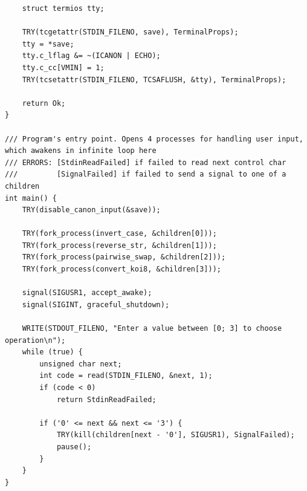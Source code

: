\begin{verbatim}
    struct termios tty;

    TRY(tcgetattr(STDIN_FILENO, save), TerminalProps);
    tty = *save;
    tty.c_lflag &= ~(ICANON | ECHO);
    tty.c_cc[VMIN] = 1;
    TRY(tcsetattr(STDIN_FILENO, TCSAFLUSH, &tty), TerminalProps);

    return Ok;
}

/// Program's entry point. Opens 4 processes for handling user input, which awakens in infinite loop here
/// ERRORS: [StdinReadFailed] if failed to read next control char 
///         [SignalFailed] if failed to send a signal to one of a children
int main() {
    TRY(disable_canon_input(&save));

    TRY(fork_process(invert_case, &children[0]));
    TRY(fork_process(reverse_str, &children[1]));
    TRY(fork_process(pairwise_swap, &children[2]));
    TRY(fork_process(convert_koi8, &children[3]));

    signal(SIGUSR1, accept_awake);
    signal(SIGINT, graceful_shutdown);

    WRITE(STDOUT_FILENO, "Enter a value between [0; 3] to choose operation\n");
    while (true) {
        unsigned char next;
        int code = read(STDIN_FILENO, &next, 1);
		if (code < 0)
            return StdinReadFailed;

        if ('0' <= next && next <= '3') {
            TRY(kill(children[next - '0'], SIGUSR1), SignalFailed);
            pause();
        }
    }
}

\end{verbatim}
